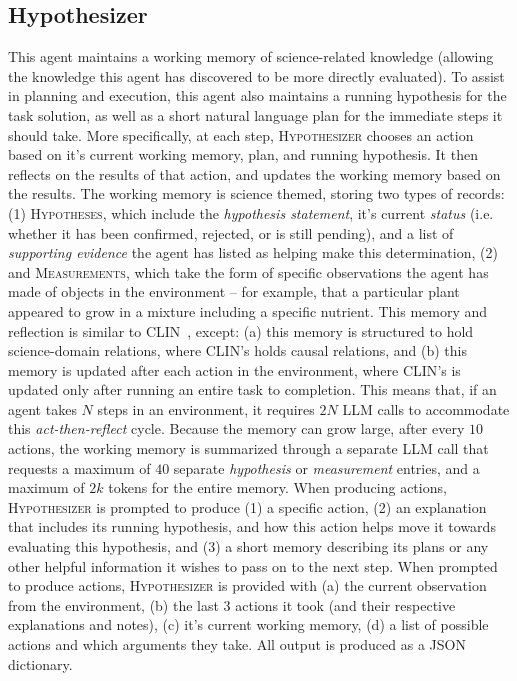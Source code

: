 \documentclass{article}
\begin{document}
\subsection{Hypothesizer}
\label{sec:appendix-hypothesizer}
This agent maintains a working memory of science-related knowledge (allowing the knowledge this agent has discovered to be more directly evaluated).  To assist in planning and execution, this agent also maintains a running hypothesis for the task solution, as well as a short natural language plan for the immediate steps it should take.  More specifically, at each step, \textsc{Hypothesizer} chooses an action based on it's current working memory, plan, and running hypothesis.  It then reflects on the results of that action, and updates the working memory based on the results.  The working memory is science themed, storing two types of records: (1) \textsc{Hypotheses}, which include the \textit{hypothesis statement}, it's current \textit{status} (i.e. whether it has been confirmed, rejected, or is still pending), and a list of \textit{supporting evidence} the agent has listed as helping make this determination, (2) and \textsc{Measurements}, which take the form of specific observations the agent has made of objects in the environment -- for example, that a particular plant appeared to grow in a mixture including a specific nutrient.  This memory and reflection is similar to \textsc{CLIN}~\cite{Majumder2023CLINAC}, except: (a) this memory is structured to hold science-domain relations, where \textsc{CLIN}'s holds causal relations, and (b) this memory is updated after each action in the environment, where \textsc{CLIN}'s is updated only after running an entire task to completion.  This means that, if an agent takes $N$ steps in an environment, it requires $2N$ LLM calls to accommodate this \textit{act-then-reflect} cycle.  Because the memory can grow large, after every $10$ actions, the working memory is summarized through a separate LLM call that requests a maximum of $40$ separate \textit{hypothesis} or \textit{measurement} entries, and a maximum of $2k$ tokens for the entire memory.  When producing actions, \textsc{Hypothesizer} is prompted to produce (1) a specific action, (2) an explanation that includes its running hypothesis, and how this action helps move it towards evaluating this hypothesis, and (3) a short memory describing its plans or any other helpful information it wishes to pass on to the next step.  When prompted to produce actions, \textsc{Hypothesizer} is provided with (a) the current observation from the environment, (b) the last 3 actions it took (and their respective explanations and notes), (c) it's current working memory, (d) a list of possible actions and which arguments they take.  All output is produced as a \textsc{JSON} dictionary. 
\end{document}

